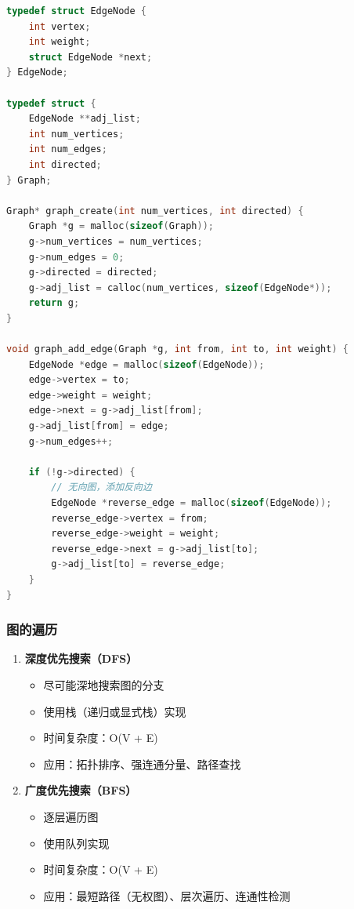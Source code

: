 \begin{lstlisting}[language=C, caption={图的邻接表表示}]
typedef struct EdgeNode {
    int vertex;
    int weight;
    struct EdgeNode *next;
} EdgeNode;

typedef struct {
    EdgeNode **adj_list;
    int num_vertices;
    int num_edges;
    int directed;
} Graph;

Graph* graph_create(int num_vertices, int directed) {
    Graph *g = malloc(sizeof(Graph));
    g->num_vertices = num_vertices;
    g->num_edges = 0;
    g->directed = directed;
    g->adj_list = calloc(num_vertices, sizeof(EdgeNode*));
    return g;
}

void graph_add_edge(Graph *g, int from, int to, int weight) {
    EdgeNode *edge = malloc(sizeof(EdgeNode));
    edge->vertex = to;
    edge->weight = weight;
    edge->next = g->adj_list[from];
    g->adj_list[from] = edge;
    g->num_edges++;

    if (!g->directed) {
        // 无向图，添加反向边
        EdgeNode *reverse_edge = malloc(sizeof(EdgeNode));
        reverse_edge->vertex = from;
        reverse_edge->weight = weight;
        reverse_edge->next = g->adj_list[to];
        g->adj_list[to] = reverse_edge;
    }
}
\end{lstlisting}

\subsubsection{图的遍历}

\begin{enumerate}
  \item \textbf{深度优先搜索（DFS）}
    \begin{itemize}
      \item 尽可能深地搜索图的分支
      \item 使用栈（递归或显式栈）实现
      \item 时间复杂度：O(V + E)
      \item 应用：拓扑排序、强连通分量、路径查找
    \end{itemize}

  \item \textbf{广度优先搜索（BFS）}
    \begin{itemize}
      \item 逐层遍历图
      \item 使用队列实现
      \item 时间复杂度：O(V + E)
      \item 应用：最短路径（无权图）、层次遍历、连通性检测
    \end{itemize}
\end{enumerate}

